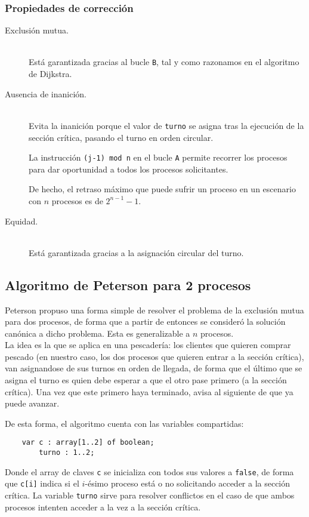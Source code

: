 \subsubsection{Propiedades de corrección}
\begin{description}
    \item [Exclusión mutua.]~\\
        Está garantizada gracias al bucle \verb|B|, tal y como razonamos en el algoritmo de Dijkstra.
    \item [Ausencia de inanición.]~\\
        Evita la inanición porque el valor de \verb|turno| se asigna tras la ejecución de la sección crítica, pasando el turno en orden circular.

        La instrucción \verb|(j-1) mod n| en el bucle \verb|A| permite recorrer los procesos para dar oportunidad a todos los procesos solicitantes.

        De hecho, el retraso máximo que puede sufrir un proceso en un escenario con $n$ procesos es de $2^{n-1}-1$.
    \item [Equidad.]~\\
        Está garantizada gracias a la asignación circular del turno.
\end{description}


\subsection{Algoritmo de Peterson para 2 procesos}
Peterson propuso una forma simple de resolver el problema de la exclusión mutua para dos procesos, de forma que a partir de entonces se consideró la solución canónica a dicho problema. Esta es generalizable a $n$ procesos.\\

La idea es la que se aplica en una pescadería: los clientes que quieren comprar pescado (en nuestro caso, los dos procesos que quieren entrar a la sección crítica), van asignandose de sus turnos en orden de llegada, de forma que el último que se asigna el turno es quien debe esperar a que el otro pase primero (a la sección crítica). Una vez que este primero haya terminado, avisa al siguiente de que ya puede avanzar.

De esta forma, el algoritmo cuenta con las variables compartidas:
\begin{verbatim}
    var c : array[1..2] of boolean;
        turno : 1..2;
\end{verbatim}
Donde el array de claves \verb|c| se inicializa con todos sus valores a \verb|false|, de forma que \verb|c[i]| indica si el $i$-ésimo proceso está o no solicitando acceder a la sección crítica. La variable \verb|turno| sirve para resolver conflictos en el caso de que ambos procesos intenten acceder a la vez a la sección crítica.\\


